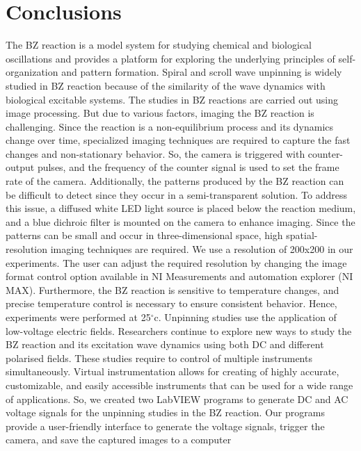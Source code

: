 \documentclass[journal=jacsat,manuscript=article]{achemso}
\begin{document}
\section{Conclusions} 
The BZ reaction is a model system for studying chemical and
biological oscillations and provides a platform for exploring the
underlying principles of self-organization and pattern
formation. Spiral and scroll wave unpinning is widely studied in BZ
reaction because of the similarity of the wave dynamics with
biological excitable systems.  The studies in BZ reactions are carried
out using image processing. But due to various factors, imaging the BZ
reaction is challenging. Since the reaction is a non-equilibrium
process and its dynamics change over time, specialized imaging
techniques are required to capture the fast changes and non-stationary
behavior. So, the camera is triggered with counter-output pulses, and
the frequency of the counter signal is used to set the frame rate of
the camera. Additionally, the patterns produced by the BZ reaction can
be difficult to detect since they occur in a semi-transparent
solution. To address this issue, a diffused white LED light source is
placed below the reaction medium, and a blue dichroic filter is
mounted on the camera to enhance imaging. Since the patterns can be
small and occur in three-dimensional space, high spatial-resolution
imaging techniques are required. We use a resolution of 200x200 in our experiments.
The user can adjust the required resolution by changing the image format control option available in NI Measurements and automation explorer (NI MAX). Furthermore, the BZ
reaction is sensitive to temperature changes, and precise temperature
control is necessary to ensure consistent behavior. Hence, experiments
were performed at 25$^{\circ}$c.
Unpinning studies use the application of low-voltage electric
fields. Researchers continue to explore new ways to study the BZ
reaction and its excitation wave dynamics using both DC and different
polarised fields. These studies require to control of multiple
instruments simultaneously. Virtual instrumentation allows for
creating of highly accurate, customizable, and easily accessible
instruments that can be used for a wide range of applications. So, we
created two LabVIEW programs to generate DC and AC voltage signals for
the unpinning studies in the BZ reaction. Our programs provide a
user-friendly interface to generate the voltage signals, trigger the
camera, and save the captured images to a computer
\end{document}
